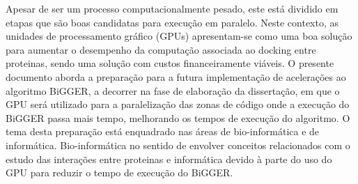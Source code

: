   Apesar de ser um processo computacionalmente pesado, este está dividido em etapas que são boas candidatas para execução em paralelo. Neste contexto, as unidades de processamento gráfico (GPUs) apresentam-se como uma boa solução para aumentar o desempenho da computação associada ao docking entre proteinas, sendo uma solução com custos financeiramente viáveis.
O presente documento aborda a preparação para a futura implementação de acelerações ao algoritmo BiGGER\cite{biggerPaper}, a decorrer na fase de elaboração da dissertação, em que o GPU será utilizado para a paralelização das zonas de código onde a execução do BiGGER passa mais tempo, melhorando os tempos de execução do algoritmo.
O tema desta preparação está enquadrado nas áreas de bio-informática e de informática. Bio-informática no sentido de envolver conceitos relacionados com o estudo das interações entre proteinas e informática devido à parte do uso do GPU para reduzir o tempo de execução do BiGGER.

